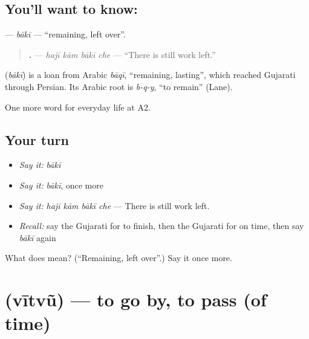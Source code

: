 \subsection*{You'll want to know: }
\textbf{} — \emph{bākī} — \textquotedblleft{}remaining, left over\textquotedblright{}.

\begin{quote}
\textbf{   .} — \emph{hajī kām bākī che} — \textquotedblleft{}There is still work left.\textquotedblright{}
\end{quote}

\begin{cousinweb}
\textbf{} (\emph{bākī}) is a loan from Arabic \emph{bāqī}, \textquotedblleft{}remaining, lasting\textquotedblright{}, which reached Gujarati through Persian. Its Arabic root is \emph{b-q-y}, \textquotedblleft{}to remain\textquotedblright{} (Lane).
\end{cousinweb}

\begin{grammarlens}[title={What you've built}]
One more word for everyday life at A2.
\end{grammarlens}

\subsection*{Your turn}
\begin{itemize}
\raggedright
  \item \emph{Say it:} \emph{bākī}
  \item \emph{Say it:} \emph{bākī}, once more
  \item \emph{Say it:} \emph{hajī kām bākī che} — There is still work left.
  \item \emph{Recall:} say the Gujarati for to finish, then the Gujarati for on time, then say \emph{bākī} again
\end{itemize}

\begin{tcolorbox}[breakable,colback=teal!4,colframe=teal!35!black,title={Before you move on}]
What does  mean? (\textquotedblleft{}Remaining, left over\textquotedblright{}.) Say it once more.
\end{tcolorbox}
\section[\texorpdfstring{\gu{વીતવું} (vītvũ)}{વીતવું (vītvũ)}]{ (vītvũ) — to go by, to pass (of time)}

